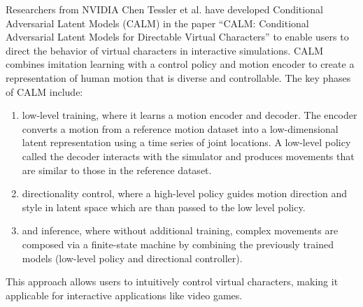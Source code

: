 Researchers from NVIDIA  Chen Tessler et al. have developed Conditional Adversarial Latent Models (CALM)  in the paper ``CALM: Conditional Adversarial Latent Models for Directable Virtual Characters''\cite{CALM} to enable users to direct the behavior of virtual characters in interactive simulations. CALM combines imitation learning with a control policy and motion encoder to create a representation of human motion that is diverse and controllable. The key phases of CALM include:
\begin{enumerate}
    \item low-level training, where it learns a motion encoder and decoder. The encoder converts a motion from a reference motion dataset into a low-dimensional latent representation using a time series of joint locations. A low-level policy called the decoder interacts with the simulator and produces movements that are similar to those in the reference dataset. 
    \item directionality control, where a high-level policy guides motion direction and style in latent space which are than passed to the low level policy. 
    \item and inference, where without additional training, complex movements are composed via a finite-state machine by combining the previously trained models (low-level policy and directional controller).
\end{enumerate}
This approach allows users to intuitively control virtual characters, making it applicable for interactive applications like video games.